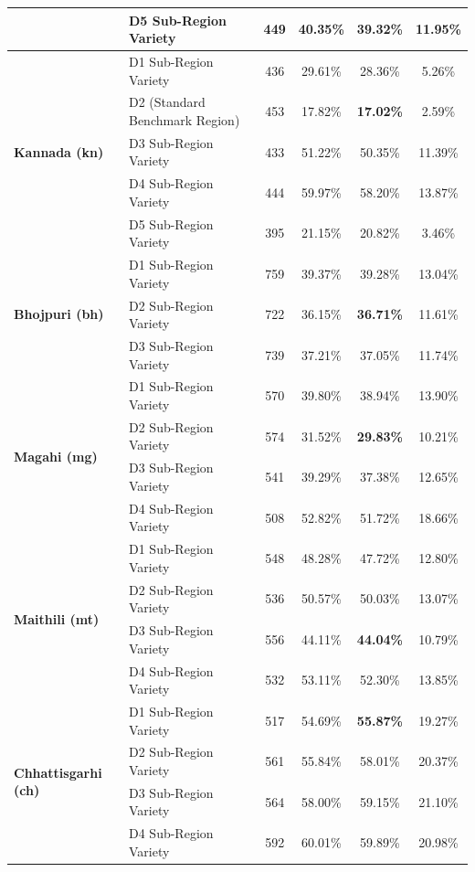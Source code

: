 \documentclass[10pt]{article}
\begin{document}
\begin{table}[h!]
\begin{tabular}{llcccc}
 & D5 Sub-Region Variety                  & 449 & 40.35\% & 39.32\% & 11.95\% \\
\midrule
\multirow{5}{*}{\textbf{Kannada (kn)}} 
 & D1 Sub-Region Variety                  & 436 & 29.61\% & 28.36\% & 5.26\% \\
 & D2 (Standard Benchmark Region)         & 453 & 17.82\% & \textbf{17.02\%} & 2.59\% \\
 & D3 Sub-Region Variety                  & 433 & 51.22\% & 50.35\% & 11.39\% \\
 & D4 Sub-Region Variety                  & 444 & 59.97\% & 58.20\% & 13.87\% \\
 & D5 Sub-Region Variety                  & 395 & 21.15\% & 20.82\% & 3.46\% \\
\midrule
\multirow{3}{*}{\textbf{Bhojpuri (bh)}} 
 & D1 Sub-Region Variety                  & 759 & 39.37\% & 39.28\% & 13.04\% \\
 & D2 Sub-Region Variety                  & 722 & 36.15\% & \textbf{36.71\%} & 11.61\% \\
 & D3 Sub-Region Variety                  & 739 & 37.21\% & 37.05\% & 11.74\% \\
\midrule
\multirow{4}{*}{\textbf{Magahi (mg)}} 
 & D1 Sub-Region Variety                  & 570 & 39.80\% & 38.94\% & 13.90\% \\
 & D2 Sub-Region Variety                  & 574 & 31.52\% & \textbf{29.83\%} & 10.21\% \\
 & D3 Sub-Region Variety                  & 541 & 39.29\% & 37.38\% & 12.65\% \\
 & D4 Sub-Region Variety                  & 508 & 52.82\% & 51.72\% & 18.66\% \\
\midrule
\multirow{4}{*}{\textbf{Maithili (mt)}} 
 & D1 Sub-Region Variety                  & 548 & 48.28\% & 47.72\% & 12.80\% \\
 & D2 Sub-Region Variety                  & 536 & 50.57\% & 50.03\% & 13.07\% \\
 & D3 Sub-Region Variety                  & 556 & 44.11\% & \textbf{44.04\%} & 10.79\% \\
 & D4 Sub-Region Variety                  & 532 & 53.11\% & 52.30\% & 13.85\% \\
\midrule
\multirow{4}{*}{\textbf{Chhattisgarhi (ch)}} 
 & D1 Sub-Region Variety                  & 517 & 54.69\% & \textbf{55.87\%} & 19.27\% \\
 & D2 Sub-Region Variety                  & 561 & 55.84\% & 58.01\% & 20.37\% \\
 & D3 Sub-Region Variety                  & 564 & 58.00\% & 59.15\% & 21.10\% \\
 & D4 Sub-Region Variety                  & 592 & 60.01\% & 59.89\% & 20.98\% \\
\bottomrule
\end{tabular}
\end{table}
\end{document}

